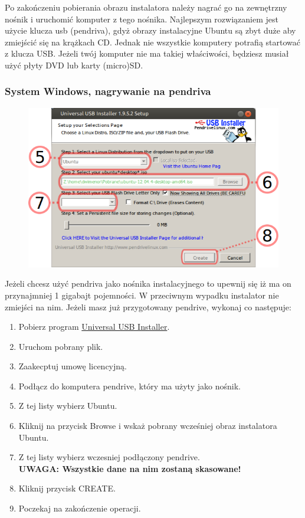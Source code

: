 Po zakończeniu pobierania obrazu instalatora należy nagrać go na zewnętrzny nośnik i uruchomić komputer z tego nośnika. Najlepszym rozwiązaniem jest użycie klucza usb (pendriva), gdyż obrazy instalacyjne Ubuntu są zbyt duże aby zmiejścić się na krążkach CD. Jednak nie wszystkie komputery potrafią startować z klucza USB. Jeżeli twój komputer nie ma takiej właściwości, będziesz musiał użyć płyty DVD lub karty (micro)SD.
\subsubsection{System Windows, nagrywanie na pendriva}
\begin{figure}
		\includegraphics[width=\linewidth]{images/instalacja_nagrywanie_obrazu.png}
\end{figure}
\noindent Jeżeli chcesz użyć pendriva jako nośnika instalacyjnego to upewnij się iż ma on przynajmniej 1 gigabajt pojemności. W przeciwnym wypadku instalator nie zmiejści na nim. Jeżeli masz już przygotowany pendrive, wykonaj co następuje:
\begin{enumerate}
\item Pobierz program \href{http://www.pendrivelinux.com/downloads/Universal-USB-Installer/Universal-USB-Installer-1.9.5.2.exe}{Universal USB Installer}.
\item Uruchom pobrany plik.
\item Zaakecptuj umowę licencyjną.
\item Podłącz do komputera pendrive, który ma użyty jako nośnik.
\item Z tej listy wybierz Ubuntu.
\item Kliknij na przycisk Browse i wskaż pobrany wcześniej obraz instalatora Ubuntu.
\item Z tej listy wybierz wczesniej podłączony pendrive.\\
\textbf{UWAGA: Wszystkie dane na nim zostaną skasowane!}
\item Kliknij przycisk CREATE.
\item Poczekaj na zakończenie operacji.
\end{enumerate}
\clearpage
